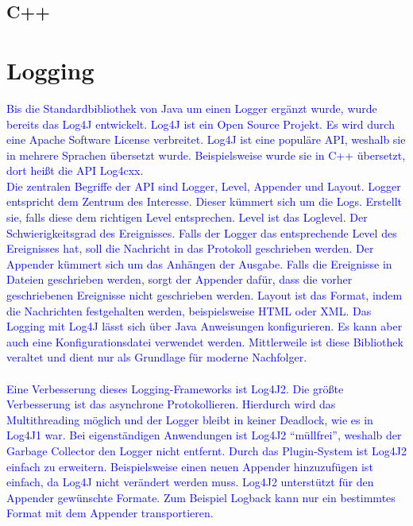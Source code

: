 \subsection{C++}\label{subsec:c++}


\section{Logging}\label{sec:logging-verfahren}

\textcolor{blue}{
    Bis die Standardbibliothek von Java um einen Logger ergänzt wurde, wurde bereits das Log4J entwickelt.
    Log4J ist ein Open Source Projekt.
    Es wird durch eine Apache Software License verbreitet.
    Log4J ist eine populäre API, weshalb sie in mehrere Sprachen übersetzt wurde.
    Beispielsweise wurde sie in C++ übersetzt, dort heißt die API Log4cxx.
    \\
    Die zentralen Begriffe der API sind Logger, Level, Appender und Layout.
    Logger entspricht dem Zentrum des Interesse.
    Dieser kümmert sich um die Logs.
    Erstellt sie, falls diese dem richtigen Level entsprechen.
    Level ist das Loglevel.
    Der Schwierigkeitsgrad des Ereignisses.
    Falls der Logger das entsprechende Level des Ereignisses hat, soll die Nachricht in das Protokoll geschrieben werden.
    Der Appender kümmert sich um das Anhängen der Ausgabe.
    Falls die Ereignisse in Dateien geschrieben werden, sorgt der Appender dafür, dass die vorher geschriebenen Ereignisse nicht geschrieben werden.
    Layout ist das Format, indem die Nachrichten festgehalten werden, beispielsweise HTML oder XML.
    Das Logging mit Log4J lässt sich über Java Anweisungen konfigurieren.
    Es kann aber auch eine Konfigurationsdatei verwendet werden.
    Mittlerweile ist diese Bibliothek veraltet und dient nur als Grundlage für moderne Nachfolger.
    \\
    \\
    Eine Verbesserung dieses Logging-Frameworks ist Log4J2.
    Die größte Verbesserung ist das asynchrone Protokollieren.
    Hierdurch wird das Multithreading möglich und der Logger bleibt in keiner Deadlock, wie es in Log4J1 war.
    Bei eigenständigen Anwendungen ist Log4J2 \enquote{müllfrei}, weshalb der Garbage Collector den Logger nicht entfernt.
    Durch das Plugin-System ist Log4J2 einfach zu erweitern.
    Beispielsweise einen neuen Appender hinzuzufügen ist einfach, da Log4J nicht verändert werden muss.
    Log4J2 unterstützt für den Appender gewünschte Formate.
    Zum Beispiel Logback kann nur ein bestimmtes Format mit dem Appender transportieren.
}\autocite{rheinwerk, baeldung, log4j2}


